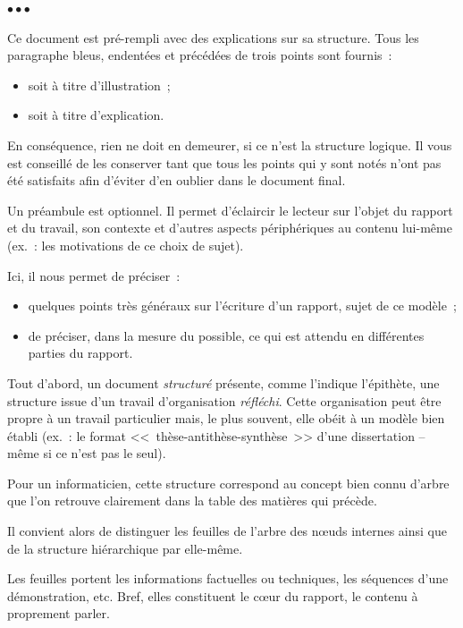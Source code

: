 \documentclass[11pt, french, screen, research-development]{report-rd-info}
\newenvironment{explanation}
{\color{blue}
 \begin{list}{}{\hspace{0.2\textwidth}\color{blue}}\item $\bullet\bullet\bullet$
}
{\end{list}}
\begin{document}
\begin{explanation}
   Ce document est pré-rempli avec des explications sur sa structure.
   Tous les paragraphe bleus, endentées et précédées de trois points sont fournis~:
   \begin{itemize}
      \item soit à titre d'illustration~;
      \item soit à titre d'explication.
   \end{itemize}
   En conséquence, rien ne doit en demeurer, si ce n'est la structure logique.
   Il vous est conseillé de les conserver tant que tous les points qui y sont notés n'ont pas été satisfaits afin d'éviter d'en oublier dans le document final.

   \bigskip

   Un préambule est optionnel.
   Il permet d'éclaircir le lecteur sur l'objet du rapport et du travail, son contexte et d'autres aspects périphériques au contenu lui-même (ex.~: les motivations de ce choix de sujet).

   Ici, il nous permet de préciser~:
   \begin{itemize}
      \item quelques points très généraux sur l'écriture d'un rapport, sujet de ce modèle~;
      \item de préciser, dans la mesure du possible, ce qui est attendu en différentes parties du rapport.
   \end{itemize}

   \bigskip

   Tout d'abord, un document \emph{structuré} présente, comme l'indique l'épithète, une structure issue d'un travail d'organisation \emph{réfléchi}.
   Cette organisation peut être propre à un travail particulier mais, le plus souvent, elle obéit à un modèle bien établi (ex.~: le format <<~thèse-antithèse-synthèse~>> d'une dissertation -- même si ce n'est pas le seul).

   Pour un informaticien, cette structure correspond au concept bien connu d'arbre que l'on retrouve clairement dans la table des matières qui précède.

   Il convient alors de distinguer les feuilles de l'arbre des n\oe uds internes ainsi que de la structure hiérarchique par elle-même.

   Les feuilles portent les informations factuelles ou techniques, les séquences d'une démonstration, etc.
   Bref, elles constituent le c\oe ur du rapport, le contenu à proprement parler.


\end{explanation}
\end{document}
